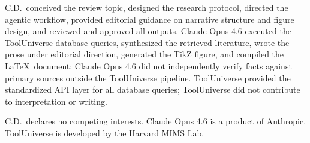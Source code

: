 \documentclass[10pt]{article}
\begin{document}
\vspace{\TSGrid}

{\sansfont\TSStep\bfseries{}\par}
\vspace{\TSHalf}
{\TSBody\small
C.D.\ conceived the review topic, designed the research protocol, directed the
agentic workflow, provided editorial guidance on narrative structure and figure
design, and reviewed and approved all outputs. Claude Opus 4.6 executed the
ToolUniverse database queries, synthesized the retrieved literature, wrote the
prose under editorial direction, generated the TikZ figure, and compiled the
\LaTeX\ document; Claude Opus 4.6 did not independently verify facts against
primary sources outside the ToolUniverse pipeline. ToolUniverse provided the
standardized API layer for all database queries; ToolUniverse did not contribute
to interpretation or writing.\par}

\vspace{\TSGrid}

{\sansfont\TSStep\bfseries{}\par}
\vspace{\TSHalf}
{\TSBody\small
C.D.\ declares no competing interests. Claude Opus 4.6 is a product of
Anthropic. ToolUniverse is developed by the Harvard MIMS Lab.\par}

\vspace{\TSGrid}
\TSRule{\linewidth}{0.2pt}
\vspace{\TSGrid}

{\sansfont\TSStep\bfseries{}\par}
\vspace{\TSHalf}
\end{document}
